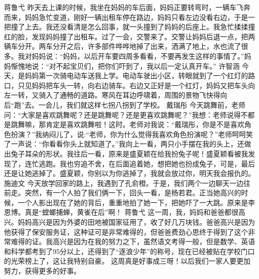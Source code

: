 {}\markdownRendererInterblockSeparator
{}蒋鲁弋\markdownRendererInterblockSeparator
{}昨天去上课的时候，我坐在妈妈的车后面，妈妈正要转弯时，一辆车飞奔而来，妈妈急忙变道，刚好一辆出租车停在路边，妈妈只看左边没看右边，于是一把撞了上去。我还没看清是怎么回事，就一头撞到了妈妈的后座上。我急忙揉揉撞红的脸，发现妈妈撞了出租车。过了一会，交警来了。交警让妈妈后退一点，把两辆车分开。两车分开之后，许多部件哗哗地掉了出来，洒满了地上，水也流了很多。我对妈妈说：“妈妈，以后开车要四周多看看，不要再发生这样的事情了。”妈妈惭愧地说：“对不起宝贝们，把你们吓到了，我以后一定认真开车。”\markdownRendererInterblockSeparator
{}\markdownRendererInterblockSeparator
{}许智涵\markdownRendererInterblockSeparator
{}今天，是妈妈第一次骑电动车送我上学。电动车驶出小区，转眼就到了一个红灯的路口，只见妈妈把车头一转，向右边骑车。右边又正好是一个红灯，妈妈又把车头向左一转，又骑入了通畅的道路。寒风在耳边呼啸着，周围的景物飞快得向后“跑”去。一会儿，我们就这样七拐八拐到了学校。 \markdownRendererInterblockSeparator
{}\markdownRendererInterblockSeparator
{}戴瑞彤\markdownRendererInterblockSeparator
{}今天跳舞前，老师问：“大家是喜欢跳舞呢？还是跳舞呢？还是更喜欢跳舞呢？”我想：老师说得不都是跳舞嘛，那肯定是喜欢跳舞啦！这时。老师对我说：“戴瑞彤，你是不是喜欢角色扮演？”我纳闷儿了，说:“老师，你为什么觉得我喜欢角色扮演呢？”老师呵呵笑了一声说：“你看看你头上就知道了。”我向上一看，两只小手摆在我的头上，还做出兔子耳朵的形状。我往后一看，原来是盛夏颖在给我扮兔子呢！盛夏颖看被我发现了，连忙逃跑。我也穷追不舍，在后面追着她，想把她也扮成兔子，可是，最后还是让她逃掉了。盛夏颖，你别以为你逃掉了，我就会放过你，明天我会报仇的。\markdownRendererInterblockSeparator
{}\markdownRendererInterblockSeparator
{}施迪文\markdownRendererInterblockSeparator
{}今天放学回家的路上，我遇到了孔俞橙。于是，我们两个一边聊天一边往前走。突然，有一个人拍了我们俩一下，回头一看，是杨若君。正当她高兴的时候，一个人影出现在了她的背后，重重地拍了她一下，把她吓了一大跳。原来是李恩博。真是“螳螂捕蝉，黄雀在后”啊！\markdownRendererInterblockSeparator
{}\markdownRendererInterblockSeparator
{}蒋鲁弋\markdownRendererInterblockSeparator
{}这一周，我，妈妈和爸爸都很高兴。妈妈高兴是因为外婆的田地被国家征用了，收了好几万块钱。爸爸高兴是因为他获得了保安服务证，这种证可是非常难得的，但爸爸费劲心思终于得到了这个非常难得的证。我高兴是因为在我的努力之下，虽然语文考得一般，但是数学、英语和科学都考到了95分以上，还得到了“逐浪少年”的称号，现在已经被贴在学校门口的光荣榜上了，这让我特别自豪。 这周真是好事成三呀！以后我们一家人要更加努力，获得更多的好事。\markdownRendererInterblockSeparator
